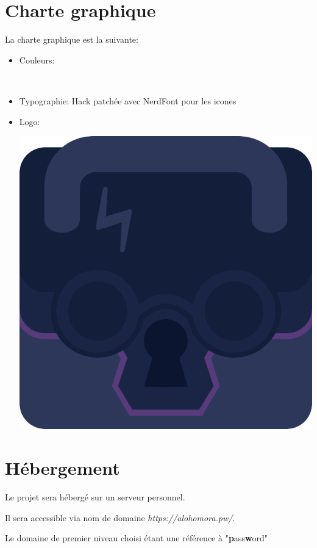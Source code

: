 \documentclass[oneside]{report}
\newcommand{\writecol}[1] {
	\subitem{\textcolor[HTML]{#1}{\# #1}}
}
\begin{document}
	\section{Charte graphique}
	{
		\par La charte graphique est la suivante:\\
		\begin{itemize}
			\item Couleurs:
				\writecol{0C1530}
				\writecol{131e3b}
				\writecol{1A2546}
				\writecol{573b7a}
				\writecol{2C375A}
				\writecol{016937}
				\writecol{06a75b}\\
			\item Typographie: Hack patchée avec NerdFont pour les icones\\
			\item{Logo:}\\
				\par\includegraphics[scale=.125]{logo}
		\end{itemize}
	}

	\section{Hébergement}
	{
		\par Le projet sera hébergé sur un serveur personnel.
		\par Il sera accessible via nom de domaine \textit{https://alohomora.pw/}.
		\par Le domaine de premier niveau choisi étant une référence à "\textbf{p}ass\textbf{w}ord"
	}
\end{document}
